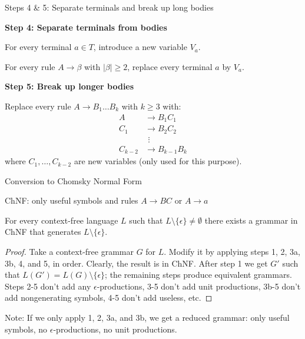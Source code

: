 \documentclass[handout]{beamer}
\begin{document}
\begin{frame}{Steps 4 \& 5: Separate terminals and break up long bodies}

	\textbf{Step 4: Separate terminals from bodies}

	For every terminal $a\in T$, introduce a new variable $V_a$.

	For every rule $A\to\beta$ with $|\beta|\geq 2$, replace every terminal $a$ by $V_a$.
	
	\bigskip

	\textbf{Step 5: Break up longer bodies}

	Replace every rule $A\to B_1\dots B_k$ with $k\geq 3$ with:
	\begin{align*}
		A&\to B_1 C_1\\
		C_1&\to B_2 C_2\\
		&\ \,\vdots\\
		C_{k-2}&\to B_{k-1}B_k
	\end{align*}
	where $C_1,\dots,C_{k-2}$ are new variables (only used for this purpose).
	
\end{frame}


\begin{frame}{Conversion to Chomsky Normal Form}

	ChNF: only useful symbols and rules \alert{$A\to BC$} or \alert{$A\to a$}
	
	\begin{theorem}
		For every context-free language $L$ such that $L\setminus \{\epsilon\}\neq \emptyset$ there exists a grammar in ChNF that generates $L\setminus \{\epsilon\}$.
	\end{theorem}
	\begin{proof}
		Take a context-free grammar $G$ for $L$. Modify it by applying steps 1, 2, 3a, 3b, 4, and 5, in order. Clearly, the result is in ChNF. After step 1 we get $G'$ such that $L(G')=L(G)\setminus \{\epsilon\}$; the remaining steps produce equivalent grammars. Steps 2-5 don't add any $\epsilon$-productions, 3-5 don't add unit productions, 3b-5 don't add nongenerating symbols, 4-5 don't add useless, etc.
	\end{proof}

	Note: If we only apply 1, 2, 3a, and 3b, we get a \alert{reduced} grammar: only useful symbols, no $\epsilon$-productions, no unit productions.

\end{frame}
\end{document}
